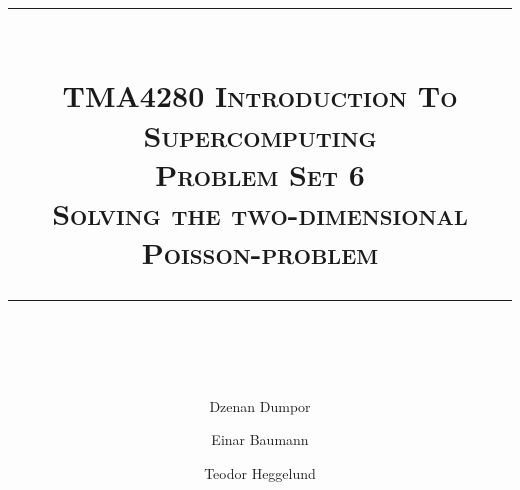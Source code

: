 





\author{Dzenan Dumpor \and Einar Baumann \and Teodor Heggelund}
\title{
    \vspace{-1in}
    \vspace{0.1in}
    \rule{\textwidth}{0.5pt} \\[0.5cm]
    \normalfont \normalsize \textsc{TMA4280 Introduction To Supercomputing} \\ [20pt]
    {\textsc{ \huge Problem Set 6 }} \\ [0.5cm]
    {\textsc {\Large Solving the two-dimensional Poisson-problem} } \\
    \vspace{0.1in}
    \rule{\textwidth}{2pt} \\[0.7cm]
}


\maketitle
\thispagestyle{empty}
\clearpage


